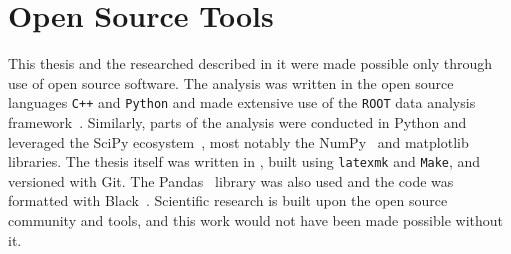 \clearpage


\clearpage
\section{Open Source Tools}\label{section:open_source}

This thesis and the researched described in it were made possible only through use of open source software.
The analysis was written in the open source languages \texttt{C++} and \texttt{Python} and made extensive use of the \texttt{ROOT} data analysis framework~\cite{Brun:1997pa}.
Similarly, parts of the analysis were conducted in Python and leveraged the SciPy ecosystem~\cite{SciPy}, most notably the NumPy~\cite{oliphant_guide_2006,NumPy_array} and matplotlib~\cite{Matplotlib} libraries.
The thesis itself was written in \LaTeXe, built using \texttt{latexmk} and \texttt{Make}, and versioned with Git.
The Pandas~\cite{mckinney-proc-scipy-2010} library was also used and the code was formatted with Black~\cite{Black_formatter}.
Scientific research is built upon the open source community and tools, and this work would not have been made possible without it.

